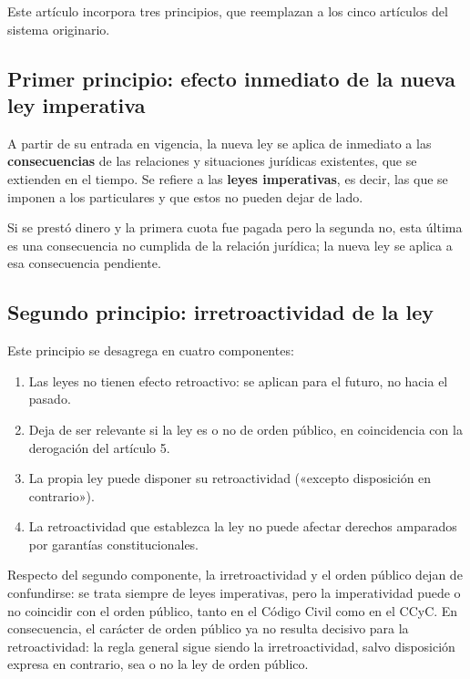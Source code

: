 \documentclass[12pt,oneside]{book}
\begin{document}
Este artículo incorpora tres principios, que reemplazan a los cinco artículos del sistema originario.

\subsection{Primer principio: efecto inmediato de la nueva ley imperativa}

\begin{definicion}
A partir de su entrada en vigencia, la nueva ley se aplica de inmediato a las \textbf{consecuencias} de las relaciones y situaciones jurídicas existentes, que se extienden en el tiempo. Se refiere a las \textbf{leyes imperativas}, es decir, las que se imponen a los particulares y que estos no pueden dejar de lado.
\end{definicion}

\begin{ejemplo}
Si se prestó dinero y la primera cuota fue pagada pero la segunda no, esta última es una consecuencia no cumplida de la relación jurídica; la nueva ley se aplica a esa consecuencia pendiente.
\end{ejemplo}

\subsection{Segundo principio: irretroactividad de la ley}

Este principio se desagrega en cuatro componentes:

\begin{enumerate}
\item Las leyes no tienen efecto retroactivo: se aplican para el futuro, no hacia el pasado.
\item Deja de ser relevante si la ley es o no de orden público, en coincidencia con la derogación del artículo 5.
\item La propia ley puede disponer su retroactividad («excepto disposición en contrario»).
\item La retroactividad que establezca la ley no puede afectar derechos amparados por garantías constitucionales.
\end{enumerate}

Respecto del segundo componente, la irretroactividad y el orden público dejan de confundirse: se trata siempre de leyes imperativas, pero la imperatividad puede o no coincidir con el orden público, tanto en el Código Civil como en el CCyC. En consecuencia, el carácter de orden público ya no resulta decisivo para la retroactividad: la regla general sigue siendo la irretroactividad, salvo disposición expresa en contrario, sea o no la ley de orden público.
\end{document}
